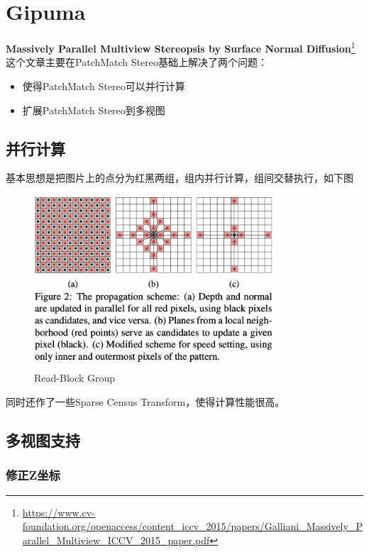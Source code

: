 \section{Gipuma}

\textbf{Massively Parallel Multiview Stereopsis by Surface Normal Diffusion}\footnote{\url{https://www.cv-foundation.org/openaccess/content_iccv_2015/papers/Galliani_Massively_Parallel_Multiview_ICCV_2015_paper.pdf}} 这个文章主要在PatchMatch Stereo基础上解决了两个问题：

\begin{itemize}
	\item 使得PatchMatch Stereo可以并行计算
	\item 扩展PatchMatch Stereo到多视图
\end{itemize}

\subsection{并行计算}

基本思想是把图片上的点分为红黑两组，组内并行计算，组间交替执行，如下图

\begin{figure}[H]
	\begin{center}
		\includegraphics[width=0.8\textwidth]{../images/parallel_compute.png}
	\end{center}
	\caption{Read-Block Group}
\end{figure}

同时还作了一些Sparse Census Transform，使得计算性能很高。

\subsection{多视图支持}

\subsubsection*{修正Z坐标}

